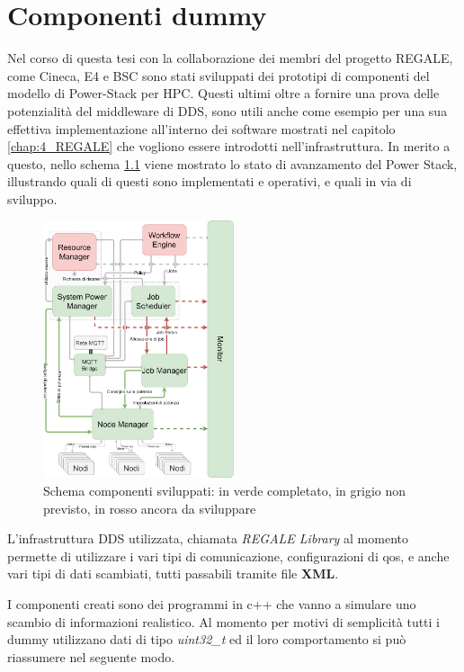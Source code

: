 \chapter{Componenti dummy}
Nel corso di questa tesi con la collaborazione dei membri del progetto REGALE, come Cineca\cite{Cineca}, E4\cite{E4} e BSC\cite{BSC} sono stati sviluppati dei prototipi di componenti del modello di Power-Stack per HPC.
Questi ultimi oltre a fornire una prova delle potenzialità del middleware di DDS, sono utili anche come esempio per una sua effettiva implementazione all'interno dei software mostrati nel capitolo \ref{chap:4_REGALE} che vogliono essere introdotti nell'infrastruttura.
In merito a questo, nello schema \ref{fig:schema_global_dummy_implementati} viene mostrato lo stato di avanzamento del Power Stack, illustrando quali di questi sono implementati e operativi, e quali in via di sviluppo.

\begin{figure}[H]
    \centering
    \includegraphics[width=0.5\textwidth]{./img/SchemaPowerStack_perdummy.drawio.png} %
    \caption{Schema componenti sviluppati: in verde completato, in grigio non previsto, in rosso ancora da sviluppare}
    \label{fig:schema_global_dummy_implementati}
\end{figure}
L'infrastruttura DDS utilizzata, chiamata \emph{REGALE Library} al momento permette di utilizzare i vari tipi di comunicazione, configurazioni di qos, e anche vari tipi di dati scambiati, tutti passabili tramite file \textbf{XML}.

I componenti creati sono dei programmi in c++ che vanno a simulare uno scambio di informazioni realistico. Al momento per motivi di semplicità tutti i dummy utilizzano dati di tipo \emph{uint32\_t} ed il loro comportamento si può riassumere nel seguente modo.

